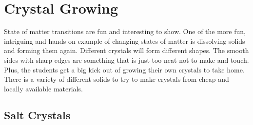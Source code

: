 \section{Crystal Growing}
State of matter transitions are fun and interesting to show. One of the more fun, intriguing and hands on example of changing states of matter is dissolving solids and forming them again. Different crystals will form different shapes. The smooth sides with sharp edges are something that is just too neat not to make and touch. Plus, the students get a big kick out of growing their own crystals to take home. There is a variety of different solids to try to make crystals from cheap and locally available materials.

\subsection{Salt Crystals}
